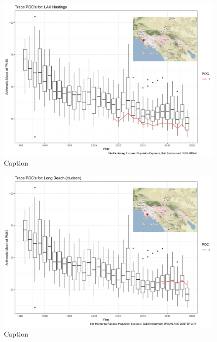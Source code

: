 \begin{figure}
    \centering
    \includegraphics[width = \textwidth]{Figures/IndividualSiteTraces/TracePOC_LAX Hastings.png}
    \caption{Caption}
    \label{fig:my_label}
\end{figure}

\begin{figure}
    \centering
    \includegraphics[width = \textwidth]{Figures/IndividualSiteTraces/TracePOC_Long Beach (Hudson).png}
    \caption{Caption}
    \label{fig:my_label}
\end{figure}

